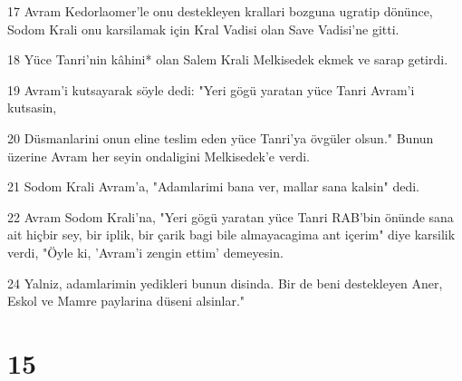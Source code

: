 \par 17 Avram Kedorlaomer'le onu destekleyen krallari bozguna ugratip dönünce, Sodom Krali onu karsilamak için Kral Vadisi olan Save Vadisi'ne gitti.
\par 18 Yüce Tanri'nin kâhini* olan Salem Krali Melkisedek ekmek ve sarap getirdi.
\par 19 Avram'i kutsayarak söyle dedi: "Yeri gögü yaratan yüce Tanri Avram'i kutsasin,
\par 20 Düsmanlarini onun eline teslim eden yüce Tanri'ya övgüler olsun." Bunun üzerine Avram her seyin ondaligini Melkisedek'e verdi.
\par 21 Sodom Krali Avram'a, "Adamlarimi bana ver, mallar sana kalsin" dedi.
\par 22 Avram Sodom Krali'na, "Yeri gögü yaratan yüce Tanri RAB'bin önünde sana ait hiçbir sey, bir iplik, bir çarik bagi bile almayacagima ant içerim" diye karsilik verdi, "Öyle ki, 'Avram'i zengin ettim' demeyesin.
\par 24 Yalniz, adamlarimin yedikleri bunun disinda. Bir de beni destekleyen Aner, Eskol ve Mamre paylarina düseni alsinlar."

\chapter{15}

